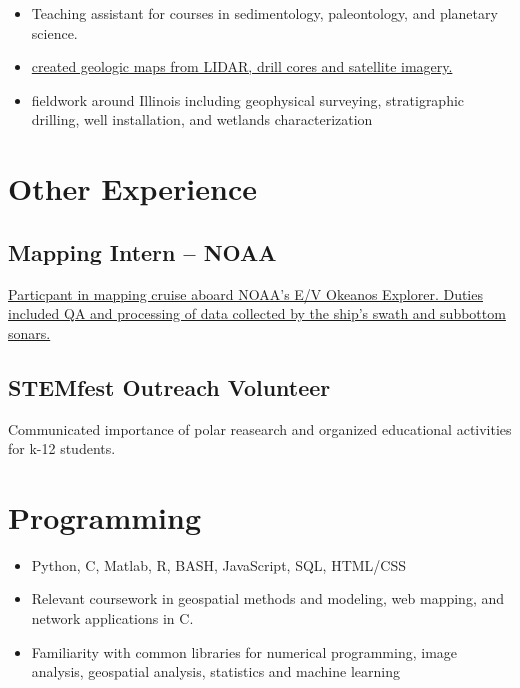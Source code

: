 \documentclass{cv_TOH}
\begin{document}
\begin{itemize}
\item Teaching assistant for courses in sedimentology, paleontology, and planetary science.
\end{itemize}

\begin{itemize}
\item \href{http://www.isgs.illinois.edu/sites/isgs/files/maps/isgs-quads/aurora-south-sg.pdf}{created geologic maps from LIDAR, drill cores and satellite imagery.}
\item fieldwork around Illinois including geophysical surveying, stratigraphic drilling, well installation, and wetlands characterization 
\end{itemize}

\section{Other Experience}
\subsection{Mapping Intern -- NOAA}
\href{http://www.niutoday.info/2014/04/17/niu-student-lands-coveted-internship-aboard-exploration-ship/}{Particpant in mapping cruise aboard NOAA's E/V Okeanos Explorer. Duties included QA and processing of data collected by the ship's swath and subbottom sonars.}
\subsection{STEMfest Outreach Volunteer}
Communicated importance of polar reasearch and organized educational activities for k-12 students.

\section{Programming}
\begin{itemize}
\item Python, C, Matlab, R, BASH, JavaScript, SQL, HTML/CSS
\item Relevant coursework in geospatial methods and modeling, web mapping, and network applications in C.
\item Familiarity with common libraries for numerical programming, image analysis, geospatial analysis, statistics and machine learning
\end{itemize}
\end{document}

